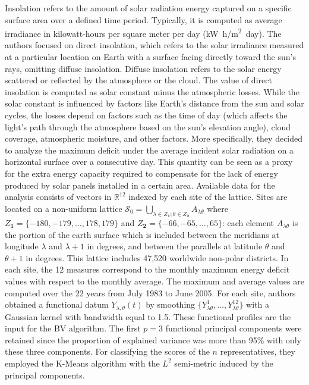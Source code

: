 Insolation refers to the amount of solar radiation energy captured on a specific surface area over a defined time period. Typically, it is computed as average irradiance in kilowatt-hours per square meter per day (\unit{\kilo\watt.h/\metre^2.day}). The authors focused on direct insolation, which refers to the solar irradiance measured at a particular location on Earth with a surface facing directly toward the sun's rays, omitting diffuse insolation. Diffuse insolation refers to the solar energy scattered or reflected by the atmosphere or the cloud. The value of direct insolation is computed as solar constant minus the atmospheric losses. While the solar constant is influenced by factors like Earth's distance from the sun and solar cycles, the losses depend on factors such as the time of day (which affects the light's path through the atmosphere based on the sun's elevation angle), cloud coverage, atmospheric moisture, and other factors. More specifically, they decided to analyze the maximum deficit under the average incident solar radiation on a horizontal surface over a consecutive day. This quantity can be seen as a proxy for the extra energy capacity required to compensate for the lack of energy produced by solar panels installed in a certain area. Available data for the analysis consists of vectors in $\mathbb{R}^{12}$ indexed by each site of the lattice. Sites are located on a non-uniform lattice $\mathcal{S}_0=\bigcup_{\lambda \in Z_{\mathbf{1}};\theta \in Z_{\mathbf{2}}}A_{\lambda\theta}$ where $Z_{\mathbf{1}} = \{ -180, -179, \dots, 178, 179\}$ and $Z_{\mathbf{2}} = \{ -66, -65, \dots, 65\}$: each element $A_{\lambda\theta}$ is the portion of the earth surface which is included between the meridians at longitude $\lambda$ and $\lambda + 1$ in degrees, and between the parallels at latitude $\theta$ and $\theta + 1$ in degrees. This lattice includes 47,520 worldwide non-polar districts. In each site, the 12 measures correspond to the monthly maximum energy deficit values with respect to the monthly average. The maximum and average values are computed over the 22 years from July 1983 to June 2005. For each site, authors obtained a functional datum $Y_{\lambda,\theta}(t)$ by smoothing $\{Y_{\lambda\theta}^1, \dots, Y_{\lambda\theta}^12\}$ with a Gaussian kernel with bandwidth equal to 1.5. These functional profiles are the input for the BV algorithm. The first $p=3$ functional principal components were retained since the proportion of explained variance was more than 95\% with only these three components. For classifying the scores of the $n$ representatives, they employed the K-Means algorithm with the $L^2$ semi-metric induced by the principal components.
